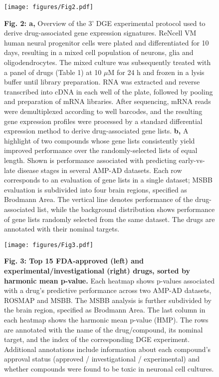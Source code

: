 \documentclass{article}
\begin{document}
\begin{figure}
  \texttt{[image: figures/Fig2.pdf]}
  \caption*{\textbf{Fig. 2: a,} Overview of the 3' DGE experimental protocol used to derive drug-associated gene expression signatures. ReNcell VM human neural progenitor cells were plated and differentiated for 10 days, resulting in a mixed cell population of neurons, glia and oligodendrocytes. The mixed culture was subsequently treated with a panel of drugs (Table 1) at 10 $\mu$M for 24 h and frozen in a lysis buffer until library preparation. RNA was extracted and reverse transcribed into cDNA in each well of the plate, followed by pooling and preparation of mRNA libraries. After sequencing, mRNA reads were demultiplexed according to well barcodes, and the resulting gene expression profiles were processed by a standard differential expression method to derive drug-associated gene lists. \textbf{b,} A highlight of two compounds whose gene lists consistently yield improved performance over the randomly-selected lists of equal length. Shown is performance associated with predicting early-vs-late disease stages in several AMP-AD datasets. Each row corresponds to an evaluation of gene lists in a single dataset; MSBB evaluation is subdivided into four brain regions, specified as Brodmann Area. The vertical line denotes performance of the drug-associated list, while the background distribution shows performance of gene lists randomly selected from the same dataset. The drugs are annotated with their nominal targets.}
\end{figure}


\begin{landscape}
  \begin{figure}
    \begin{center}
      \texttt{[image: figures/Fig3.pdf]}
    \end{center}
    \caption*{\textbf{Fig. 3: Top 15 FDA-approved (left) and experimental/investigational (right) drugs, sorted by harmonic mean p-value.} Each heatmap shows p-values associated with a drug’s predictive performance across two AMP-AD datasets, ROSMAP and MSBB. The MSBB analysis is further subdivided by the brain region, specified as Brodmann Area. The last column in each heatmap shows the harmonic mean p-value (HMP). The rows are annotated with the name of the drug/compound, its nominal target, and the index of the corresponding DGE experiment. Additional annotations include information about each compound’s approval status (approved / investigational / experimental) and whether compounds were found to be toxic in neuronal cell cultures.}
\end{figure}
\end{landscape}
\end{document}
